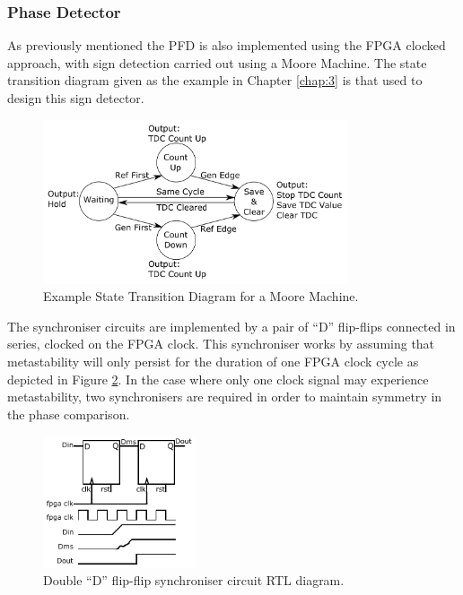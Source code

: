 \subsubsection{Phase Detector}
As previously mentioned the \ac{PFD} is also implemented using the \ac{FPGA} clocked approach, with sign detection carried out using a Moore Machine. The state transition diagram given as the example in Chapter \ref{chap:3} is that used to design this sign detector. 
\begin{figure}[h]
	\centering
	\includegraphics[width=0.8\textwidth]{../state_trans_new}
	\caption[Example State Transition Diagram for a Moore Machine]{Example State Transition Diagram for a Moore Machine.}
	\label{fig:state_trans_reprint}
\end{figure}

The synchroniser circuits are implemented by a pair of ``D'' flip-flips connected in series, clocked on the \ac{FPGA} clock. This synchroniser works by assuming that metastability will only persist for the duration of one \ac{FPGA} clock cycle as depicted in Figure \ref{fig:synchroniser_behav}. In the case where only one clock signal may experience metastability, two synchronisers are required in order to maintain symmetry in the phase comparison.
\begin{figure}[h]
\centering
\includegraphics[width=0.4\textwidth]{../synchroniser_behav}
\caption[Double ``D'' flip-flip synchroniser circuit \ac{RTL} diagram]{Double ``D'' flip-flip synchroniser circuit \ac{RTL} diagram.}
\label{fig:synchroniser_behav}
\end{figure}

